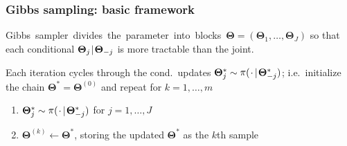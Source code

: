 \documentclass[18pt]{beamer}
\newenvironment{tightEnumerate}[1][1.]{%
  \vspace{-.3\baselineskip}%
  \begin{enumerate}[#1]
  \addtolength\itemsep{-.1\baselineskip}
}{
  \end{enumerate}
}
\newcommand{\given}{\thinnerspace | \thinnerspace}
\newcommand{\thinnerspace}{\mskip.5\thinmuskip}
\newcommand{\placeholder}{\thinnerspace \cdot \thinnerspace}
\newcommand{\nextMarker}{*}
\DeclareMathOperator{\density}{\pi}
\newcommand{\randVar}{\Theta}
\newcommand{\mcIndex}{k}
\newcommand{\mcSampleSize}{m}
\begin{document}
\renewcommand{\frametitleText}{Gibbs sampling: basic framework}
\begin{frame}
\frametitle{\frametitleText}

\mbox{Gibbs sampler divides the parameter into blocks $\bm{\randVar} = (\bm{\randVar}_1, \ldots, \bm{\randVar}_J)$} 
so that each conditional $\bm{\randVar}_j \given \bm{\randVar}_{-j}$ is more tractable than the joint.

\pause
\medskip
Each iteration cycles through the cond.\ updates $\bm{\randVar}^\nextMarker_j \sim \density( \placeholder \given \bm{\randVar}^\nextMarker_{-j} )$;
i.e.\ initialize the chain $\bm{\randVar}^\nextMarker = \bm{\randVar}^{(0)}$ and repeat for $\mcIndex = 1, \ldots, \mcSampleSize$
\begin{tightEnumerate}
\item $\bm{\randVar}^\nextMarker_j \sim \density( \placeholder \given \bm{\randVar}^\nextMarker_{-j} )$ for $j = 1, \ldots, J$
\item $\bm{\randVar}^{(k)} \gets \bm{\randVar}^\nextMarker$, storing the updated $\bm{\randVar}^\nextMarker$ as the $k$th sample
\end{tightEnumerate}

\end{frame}
\end{document}
